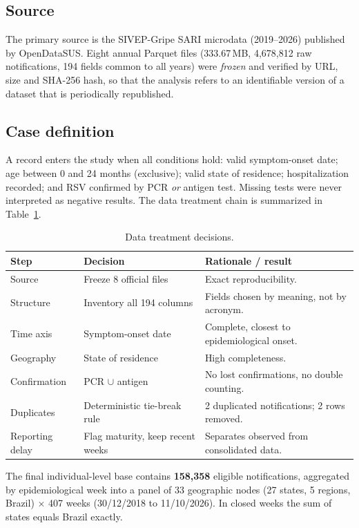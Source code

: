 \documentclass[12pt,a4paper]{article}
\begin{document}
\subsection{Source}
The primary source is the SIVEP-Gripe SARI microdata (2019--2026) published by OpenDataSUS. Eight annual Parquet files (333.67\,MB, 4{,}678{,}812 raw notifications, 194 fields common to all years) were \emph{frozen} and verified by URL, size and SHA-256 hash, so that the analysis refers to an identifiable version of a dataset that is periodically republished.

\subsection{Case definition}
A record enters the study when all conditions hold: valid symptom-onset date; age between 0 and 24 months (exclusive); valid state of residence; hospitalization recorded; and RSV confirmed by PCR \emph{or} antigen test. Missing tests were never interpreted as negative results. The data treatment chain is summarized in Table~\ref{tab:treat}.

\begin{table}[H]
\centering\small
\caption{Data treatment decisions.}\label{tab:treat}
\begin{tabular}{p{2.6cm}p{5.2cm}p{6.2cm}}
\toprule
Step & Decision & Rationale / result \\
\midrule
Source & Freeze 8 official files & Exact reproducibility. \\
Structure & Inventory all 194 columns & Fields chosen by meaning, not by acronym. \\
Time axis & Symptom-onset date & Complete, closest to epidemiological onset. \\
Geography & State of residence & High completeness. \\
Confirmation & PCR $\cup$ antigen & No lost confirmations, no double counting. \\
Duplicates & Deterministic tie-break rule & 2 duplicated notifications; 2 rows removed. \\
Reporting delay & Flag maturity, keep recent weeks & Separates observed from consolidated data. \\
\bottomrule
\end{tabular}
\end{table}

The final individual-level base contains \textbf{158{,}358} eligible notifications, aggregated by epidemiological week into a panel of 33 geographic nodes (27 states, 5 regions, Brazil) $\times$ 407 weeks (30/12/2018 to 11/10/2026). In closed weeks the sum of states equals Brazil exactly.
\end{document}
